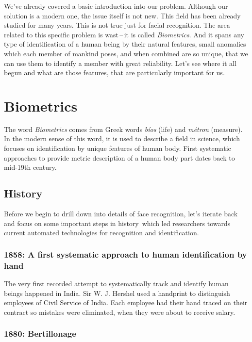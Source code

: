 We've already covered a basic introduction into our problem. Although our solution is a modern one, the issue itself is not new. This field has been already studied for many years. This is not true just for facial recognition. The area related to this specific problem is wast\,--\,it is called \textit{Biometrics}. And it spans any type of identification of a human being by their natural features, small anomalies which each member of mankind poses, and when combined are so unique, that we can use them to identify a member with great reliability. Let's see where it all begun and what are those features, that are particularly important for us.

\section{Biometrics}

The word \textit{Biometrics} comes from Greek words \textit{bíos} (life) and \textit{métron} (measure). In the modern sense of this word, it is used to describe a field in science, which focuses on identification by unique features of human body. First systematic approaches to provide metric description of a human body part dates back to mid-19th century.

\subsection{History}

Before we begin to drill down into details of face recognition, let's iterate back and focus on some important steps in history\,\cite{history} which led researchers towards current automated technologies for recognition and identification.

\subsubsection{1858: A first systematic approach to human identification by hand}

The very first recorded attempt to systematically track and identify human beings happened in India. Sir W. J. Hershel used a handprint to distinguish employees of Civil Service of India. Each employee had their hand traced on their contract so mistakes were eliminated, when they were about to receive salary.

\subsubsection{1880: Bertillonage}

